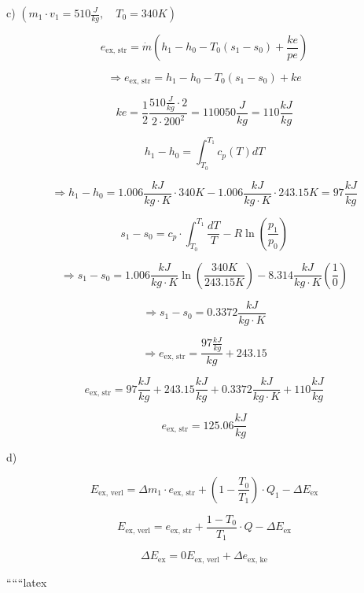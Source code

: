 c) $(m_1 \cdot v_1 = 510 \frac{J}{kg}, \quad T_0 = 340K)$


\[
e_{\text{ex, str}} = \dot{m} \left( h_1 - h_0 - T_0 (s_1 - s_0) + \frac{ke}{pe} \right)
\]

\[
\Rightarrow e_{\text{ex, str}} = h_1 - h_0 - T_0 (s_1 - s_0) + ke
\]

\[
ke = \frac{1}{2} \frac{510 \frac{J}{kg} \cdot 2}{2 \cdot 200^2} = 110050 \frac{J}{kg} = 110 \frac{kJ}{kg}
\]

\[
h_1 - h_0 = \int_{T_0}^{T_1} c_p(T) dT
\]

\[
\Rightarrow h_1 - h_0 = 1.006 \frac{kJ}{kg \cdot K} \cdot 340K - 1.006 \frac{kJ}{kg \cdot K} \cdot 243.15K = 97 \frac{kJ}{kg}
\]

\[
s_1 - s_0 = c_p \cdot \int_{T_0}^{T_1} \frac{dT}{T} - R \ln \left( \frac{p_1}{p_0} \right)
\]

\[
\Rightarrow s_1 - s_0 = 1.006 \frac{kJ}{kg \cdot K} \ln \left( \frac{340K}{243.15K} \right) - 8.314 \frac{kJ}{kg \cdot K} \left( \frac{1}{0} \right)
\]

\[
\Rightarrow s_1 - s_0 = 0.3372 \frac{kJ}{kg \cdot K}
\]

\[
\Rightarrow e_{\text{ex, str}} = \frac{97 \frac{kJ}{kg}}{kg} + 243.15
\]

\[
e_{\text{ex, str}} = 97 \frac{kJ}{kg} + 243.15 \frac{kJ}{kg} + 0.3372 \frac{kJ}{kg \cdot K} + 110 \frac{kJ}{kg}
\]

\[
e_{\text{ex, str}} = 125.06 \frac{kJ}{kg}
\]

d)

\[
E_{\text{ex, verl}} = \Delta m_1 \cdot e_{\text{ex, str}} + \left( 1 - \frac{T_0}{T_1} \right) \cdot Q_1 - \Delta E_{\text{ex}}
\]

\[
E_{\text{ex, verl}} = e_{\text{ex, str}} + \frac{1 - T_0}{T_1} \cdot Q - \Delta E_{\text{ex}}
\]

\[
\Delta E_{\text{ex}} = 0 E_{\text{ex, verl}} + \Delta e_{\text{ex, ke}}
\]

``````latex



